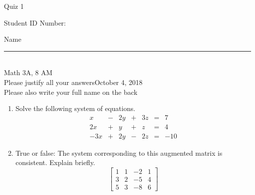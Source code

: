 \documentclass[12pt]{article}
\begin{document}
\begin{flushleft} 
\centerline{\LARGE{Quiz 1}} 
\vspace{5 mm}
{Student ID Number:}\hfill  
{Name \rule {2 in}{0.01in}}\\
Math 3A, 8 AM
\\
{Please justify all your answers}\hfill {October 4, 2018}
\\
{Please also write your full name on the back} 

\medskip
\end{flushleft}

\begin{enumerate}
	\item Solve the following system of equations.
	\[
	\begin{array}{rcrcrcr}
		x & - & 2y & + & 3z & = & 7\\
		2x & + & y & + & z & = & 4\\
		-3x & + & 2y & - & 2z & = & -10
	\end{array}
	\]
	\vfill

	\item True or false: The system corresponding to this augmented matrix is consistent. Explain briefly.
	\[
	\begin{bmatrix}
		1 & 1 & -2 & 1\\
		3 & 2 & -5 & 4\\
		5 & 3 & -8 & 6
	\end{bmatrix}
	\]
	\vfill
\end{enumerate}

\end{document}
